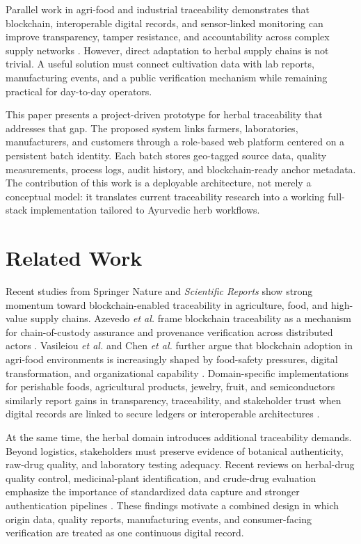 \documentclass[conference]{IEEEtran}
\begin{document}
Parallel work in agri-food and industrial traceability demonstrates that blockchain, interoperable digital records, and sensor-linked monitoring can improve transparency, tamper resistance, and accountability across complex supply networks \cite{b1,b2,b3,b4,b5,b6,b7,b8,b9}. However, direct adaptation to herbal supply chains is not trivial. A useful solution must connect cultivation data with lab reports, manufacturing events, and a public verification mechanism while remaining practical for day-to-day operators.

This paper presents a project-driven prototype for herbal traceability that addresses that gap. The proposed system links farmers, laboratories, manufacturers, and customers through a role-based web platform centered on a persistent batch identity. Each batch stores geo-tagged source data, quality measurements, process logs, audit history, and blockchain-ready anchor metadata. The contribution of this work is a deployable architecture, not merely a conceptual model: it translates current traceability research into a working full-stack implementation tailored to Ayurvedic herb workflows.

\section{Related Work}
Recent studies from Springer Nature and \emph{Scientific Reports} show strong momentum toward blockchain-enabled traceability in agriculture, food, and high-value supply chains. Azevedo \emph{et al.} frame blockchain traceability as a mechanism for chain-of-custody assurance and provenance verification across distributed actors \cite{b1}. Vasileiou \emph{et al.} and Chen \emph{et al.} further argue that blockchain adoption in agri-food environments is increasingly shaped by food-safety pressures, digital transformation, and organizational capability \cite{b2,b9}. Domain-specific implementations for perishable foods, agricultural products, jewelry, fruit, and semiconductors similarly report gains in transparency, traceability, and stakeholder trust when digital records are linked to secure ledgers or interoperable architectures \cite{b3,b4,b5,b6,b7,b8}.

At the same time, the herbal domain introduces additional traceability demands. Beyond logistics, stakeholders must preserve evidence of botanical authenticity, raw-drug quality, and laboratory testing adequacy. Recent reviews on herbal-drug quality control, medicinal-plant identification, and crude-drug evaluation emphasize the importance of standardized data capture and stronger authentication pipelines \cite{b11,b12,b13,b14,b15}. These findings motivate a combined design in which origin data, quality reports, manufacturing events, and consumer-facing verification are treated as one continuous digital record.
\end{document}
